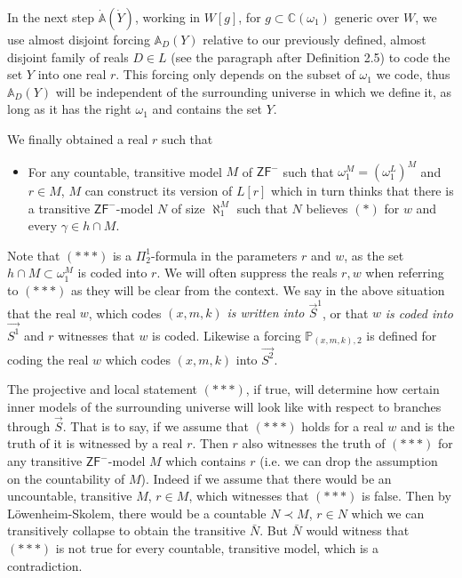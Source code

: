 \documentclass[a4paper,11pt]{article}
\newcommand{\forceP}{\mathbb{P}}
\newcommand{\ZFP}{\mathsf{ZF}^-}
\begin{document}
In the next step $\dot{\mathbb{A}} (\dot{Y})$, working in $W[g]$, for $g\subset \mathbb{C} (\omega_1)$ generic over $W$, we use almost disjoint forcing $\mathbb{A}_D(Y)$ relative to our previously defined, almost disjoint family of reals $D \in  L $ (see the paragraph after Definition 2.5)  to code the set $Y$ into one real $r$. This forcing only depends on the subset of $\omega_1$ we code, thus $\mathbb{A}_D(Y)$ will be independent of the surrounding universe in which we define it, as long as it has the right $\omega_1$ and contains the set $Y$.

We finally obtained a real $r$ such that
\begin{itemize}
\item[$({\ast}{\ast}{\ast})$] For any countable, transitive model $M$ of $\ZFP$ such that $\omega_1^M=(\omega_1^L)^M$ and $ r  \in M$, $M$ can construct its version of $L[r]$ which in turn thinks that there is a transitive $\ZFP$-model $N$ of size $\aleph_1^M$  such that $N$ believes $(\ast)$ for $w$ and every $\gamma \in h \cap M$.
\end{itemize}
Note that $({\ast} {\ast} {\ast})$ is a $\Pi^1_2$-formula in the parameters $r$ and $w$, as the set $h \cap M \subset \omega_1^M$ is coded into $r$. We will often suppress the reals $r,w$ when referring to $({\ast} {\ast} {\ast})$ as they will be clear from the context. We say in the above situation that the real $w$, which codes $(x,m,k)$\emph{ is written into $\vec{S}^1$}, or that $w$ \emph{is coded into} $\vec{S^1}$ and $r$ witnesses that $w$ is coded. Likewise a forcing $\forceP_{(x,m,k),2}$ is defined for coding the real $w$ which codes $(x,m,k)$ into $\vec{S^2}$.

 
 The projective and local statement $({\ast} { \ast} {\ast} )$, if true,  will determine how certain inner models of the surrounding universe will look like with respect to branches through $\vec{S}$.
That is to say, if we assume that $({\ast} { \ast} {\ast} )$ holds for a real $w$ and is the truth of it is witnessed by a real $r$. Then $r$ also witnesses the truth of $({\ast} { \ast} {\ast} )$ for any transitive $\ZFP$-model $M$ which contains $r$ (i.e. we can drop the assumption on the countability of $M$).
Indeed if we assume 
that there would be an uncountable, transitive $M$, $r \in M$, which witnesses that $({\ast} { \ast} {\ast} )$ is false. Then by L\"owenheim-Skolem, there would be a countable $N\prec M$, $r\in N$ which we can transitively collapse to obtain the transitive $\bar{N}$. But $\bar{N}$ would witness that $({\ast} { \ast} {\ast} )$ is not true for every countable, transitive model, which is a contradiction.
\end{document}
